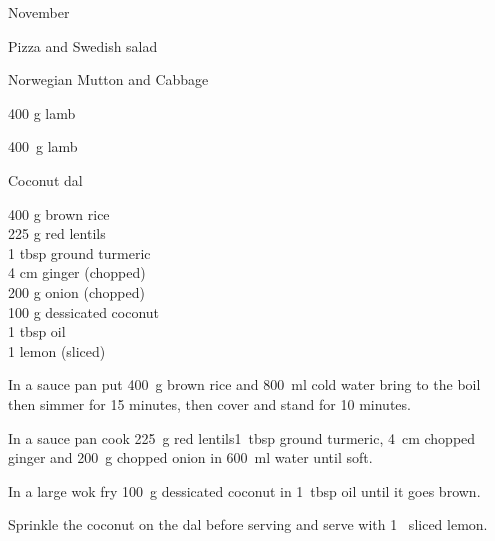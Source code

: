 \begin{menu}{November}
\begin{recipe}{1}{Pizza and Swedish salad}
\begin{instructions}
    \end{instructions}
    \end{recipe}%
  
    \begin{recipe}{2}{Norwegian Mutton and Cabbage}%
    
		\begin{ingredients}
		400 g lamb  \\
	
		\end{ingredients}
	
    \begin{instructions}
    \item 400~g  lamb
    \end{instructions}
    \end{recipe}%
  
    \begin{recipe}{2}{Coconut dal}%
    
		\begin{ingredients}
		400 g brown rice  \\
	225 g red lentils  \\
	1 tbsp ground turmeric  \\
	4 cm ginger (chopped) \\
	200 g onion (chopped) \\
	100 g dessicated coconut  \\
	1 tbsp oil  \\
	1  lemon (sliced) \\
	
		\end{ingredients}
	
    \begin{instructions}
    \item 
      In a
      sauce pan
      put
      400~g  brown rice
      and
      800~ml  cold water
      bring to the boil then simmer for 15 minutes,
      then cover and stand for 10 minutes.
    \item 
        In a sauce pan cook
        225~g  red lentils1~tbsp  ground turmeric,
        4~cm chopped ginger
        and
        200~g chopped onion
        in
        600~ml  water
        until soft.
      \item 
        In a large wok fry
        100~g  dessicated coconut
        in
        1~tbsp  oil
        until it goes brown.
      \item 
        Sprinkle the coconut on the dal
        before serving
        and
        serve with
        1~ sliced lemon.
      
    \end{instructions}
    \end{recipe}%
  
    \clearpage
    \end{menu}
	
